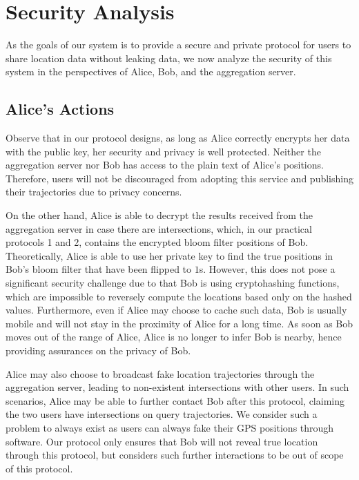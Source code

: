 \section{Security Analysis}
\label{sec:analysis}

As the goals of our system is to provide a secure and private protocol for users to share location data without leaking data, we now analyze the security of this system in the perspectives of Alice, Bob, and the aggregation server.

\subsection{Alice's Actions}

Observe that in our protocol designs, as long as Alice correctly encrypts her data with the public key, her security and privacy is well protected. Neither the aggregation server nor Bob has access to the plain text of Alice's positions. Therefore, users will not be discouraged from adopting this service and publishing their trajectories due to privacy concerns. 

On the other hand, Alice is able to decrypt the results received from the aggregation server in case there are intersections, which, in our practical protocols 1 and 2, contains the encrypted bloom filter positions of Bob. Theoretically, Alice is able to use her private key to find the true positions in Bob's bloom filter that have been flipped to $1$s. However, this does not pose a significant security challenge due to that Bob is using cryptohashing functions, which are impossible to reversely compute the locations based only on the hashed values. Furthermore, even if Alice may choose to cache such data, Bob is usually mobile and will not stay in the proximity of Alice for a long time. As soon as Bob moves out of the range of Alice, Alice is no longer to infer Bob is nearby, hence providing assurances on the privacy of Bob. 

Alice may also choose to broadcast fake location trajectories through the aggregation server, leading to non-existent intersections with other users. In such scenarios, Alice may be able to further contact Bob after this protocol, claiming the two users have intersections on query trajectories. We consider such a problem to always exist as users can always fake their GPS positions through software. Our protocol only ensures that Bob will not reveal true location through this protocol, but considers such further interactions to be out of scope of this protocol.


